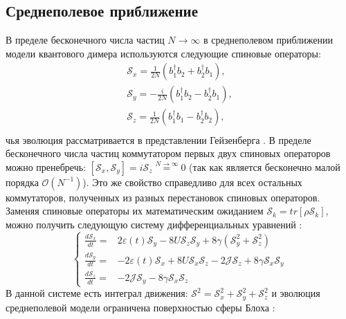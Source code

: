\subsection{Среднеполевое приближение}\label{subsec:ch3/dimer/meanfield}
В пределе бесконечного числа частиц \(N \to \infty\) в среднеполевом приближении модели квантового димера используются следующие спиновые операторы:
\begin{equation}
	\label{eq:dimer_meanfield_spin}
	\begin{gathered}
		\mathcal{S}_x = \frac{1}{2 N} \left(b^\dagger_1 b_2 + b^\dagger_2 b_1\right), \\
		\mathcal{S}_y = - \frac{i}{2 N} \left(b^\dagger_1 b_2 - b^\dagger_2 b_1\right), \\
		\mathcal{S}_z = \frac{1}{2 N} \left(b^\dagger_1 b_1 - b^\dagger_2 b_2\right), \\
	\end{gathered}
\end{equation}
чья эволюция рассматривается в представлении Гейзенберга \cite{Breuer2007}. 
В пределе бесконечного числа частиц коммутатором первых двух спиновых операторов можно пренебречь: \(\left[\mathcal{S}_x, \mathcal{S}_y\right] = i \mathcal{S}_z \stackrel{N\to\infty}{=} 0\) (так как является бесконечно малой порядка $\mathcal{O}(N^{-1})$). 
Это же свойство справедливо для всех остальных коммутаторов, полученных из разных перестановок спиновых операторов.
Заменяя спиновые операторы их математическим ожиданием \(\mathscr{S}_k = tr\left[\rho\mathcal{S}_k\right]\), можно получить следующую систему дифференциальных уравнений \cite{Hartmann2017}:
\begin{equation}
	\label{eq:dimer_meanfield_ode_spin}
		\left\{
		  \begin{array}{rl}
		    \frac{d \mathscr{S}_x}{dt} = & 2\varepsilon (t) \mathscr{S}_y - 8 U \mathscr{S}_z \mathscr{S}_y + 8 \gamma \left(\mathscr{S}_y^2+\mathscr{S}_z^2\right) \\
		    \frac{d \mathscr{S}_y}{dt} = & -2\varepsilon \left(t\right) \mathscr{S}_x + 8 U \mathscr{S}_x \mathscr{S}_z - 2 \mathcal{J} \mathscr{S}_z + 8\gamma \mathscr{S}_x \mathscr{S}_y \\
		    \frac{d \mathscr{S}_z}{dt} = & -2 \mathcal{J} \mathscr{S}_y - 8 \gamma \mathscr{S}_x \mathscr{S}_z
		  \end{array}
		\right.
\end{equation}	
В данной системе есть интеграл движения: \(\mathscr{S}^2 = \mathscr{S}_x^2 + \mathscr{S}_y^2 + \mathscr{S}_z^2\) и эволюция среднеполевой модели ограничена поверхностью сферы Блоха \cite{Nielsen2010}:
